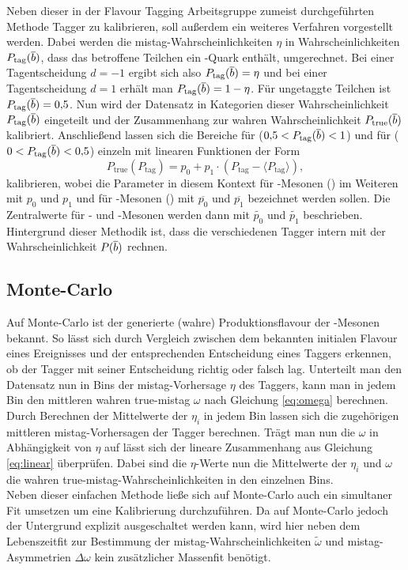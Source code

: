 Neben dieser in der Flavour Tagging Arbeitsgruppe zumeist durchgeführten Methode Tagger zu kalibrieren, soll außerdem ein weiteres Verfahren vorgestellt werden. Dabei werden die mistag-Wahrscheinlichkeiten $\eta$ in Wahrscheinlichkeiten $P_\text{tag}({\overline {{b}}})$, dass das betroffene Teilchen ein \bquarkbar-Quark enthält, umgerechnet. Bei einer Tagentscheidung $d=-1$ ergibt sich also $P_\text{tag}({\overline {{b}}})=\eta$ und bei einer Tagentscheidung $d=1$ erhält man $P_\text{tag}({\overline {{b}}})=1-\eta$. Für ungetaggte Teilchen ist $P_\text{tag}({\overline {{b}}})=0{,}5$. Nun wird der Datensatz in Kategorien dieser Wahrscheinlichkeit $P_\text{tag}({\overline {{b}}})$ eingeteilt und der Zusammenhang zur wahren Wahrscheinlichkeit $P_\text{true}({\overline {{b}}})$ kalibriert. Anschließend lassen sich die Bereiche für \bquarkbar ($0{,}5<P_\text{tag}({\overline {{b}}})<1$) und für \bquark ($0<P_\text{tag}({\overline {{b}}})<0{,}5$) einzeln mit linearen Funktionen der Form
\begin{equation}
P_\text{true}(P_\text{tag})=p_0+p_1\cdot\left(P_\text{tag}-\langle P_\text{tag}\rangle\right)\label{eq:linearPB},
\end{equation}
kalibrieren, wobei die Parameter in diesem Kontext für \Bz-Mesonen (\bquarkbar\dquark) im Weiteren mit $p_0$ und $p_1$ und für \Bzb-Mesonen (\bquark\dquarkbar) mit $\overline{p_0}$ und $\overline{p_1}$ bezeichnet werden sollen. Die Zentralwerte für \Bz- und \Bzb-Mesonen werden dann mit $\widetilde{p_0}$ und $\widetilde{p_1}$ beschrieben.\\
Hintergrund dieser Methodik ist, dass die verschiedenen Tagger intern mit der Wahrscheinlichkeit $P({\overline {{b}}})$ rechnen.

\subsection{Monte-Carlo}\label{sec:mckalibrierung}

Auf Monte-Carlo ist der generierte (wahre) Produktionsflavour der \B-Mesonen bekannt. So lässt sich durch Vergleich zwischen dem bekannten initialen Flavour eines Ereignisses und der entsprechenden Entscheidung eines Taggers erkennen, ob der Tagger mit seiner Entscheidung richtig oder falsch lag. Unterteilt man den Datensatz nun in Bins der mistag-Vorhersage $\eta$ des Taggers, kann man in jedem Bin den mittleren wahren true-mistag $\omega$ nach Gleichung \eqref{eq:omega} berechnen. Durch Berechnen der Mittelwerte der $\eta_i$ in jedem Bin lassen sich die zugehörigen mittleren mistag-Vorhersagen der Tagger berechnen. Trägt man nun die $\omega$ in Abhängigkeit von $\eta$ auf lässt sich der lineare Zusammenhang aus Gleichung \eqref{eq:linear} überprüfen. Dabei sind die $\eta$-Werte nun die Mittelwerte der $\eta_i$ und $\omega$ die wahren true-mistag-Wahrscheinlichkeiten in den einzelnen Bins.\\
Neben dieser einfachen Methode ließe sich auf Monte-Carlo auch ein simultaner Fit umsetzen um eine Kalibrierung durchzuführen. Da auf Monte-Carlo jedoch der Untergrund explizit ausgeschaltet werden kann, wird hier neben dem Lebenszeitfit zur Bestimmung der mistag-Wahrscheinlichkeiten $\widetilde{\omega}$  und mistag-Asymmetrien $\Delta\omega$ kein zusätzlicher Massenfit benötigt.

